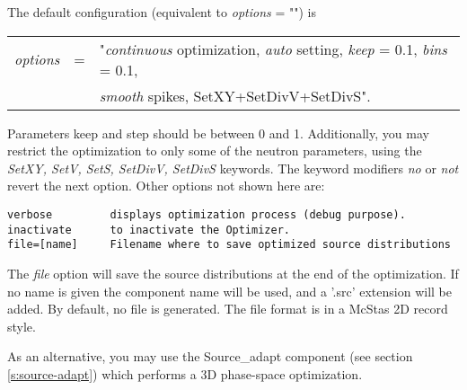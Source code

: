 The default configuration (equivalent to \textit{options} = "") is
\begin{center}
\begin{tabular}{rcl}
  \textit{options} & = & "\textit{continuous} optimization,
  \textit{auto} setting, \textit{keep} = 0.1, \textit{bins} = 0.1, \\
  & & \textit{smooth} spikes, SetXY+SetDivV+SetDivS".
\end{tabular}
\end{center}
Parameters keep and step should be between 0 and 1.
Additionally, you may restrict the optimization to only some of the neutron parameters, using the \textit{SetXY, SetV, SetS, SetDivV, SetDivS} keywords.
The keyword modifiers \textit{no} or \textit{not} revert the next option.
Other options not shown here are:
\begin{lstlisting}
verbose         displays optimization process (debug purpose).
inactivate      to inactivate the Optimizer.
file=[name]     Filename where to save optimized source distributions
\end{lstlisting}
The \textit{file} option will save the source distributions at the end of
the optimization. If no name is given the component name will be used,
and a '.src' extension will be added. By default, no file is generated.
The file format is in a McStas 2D record style.

As an alternative, you may use the Source\_adapt component
(see section \ref{s:source-adapt}) which performs
a 3D phase-space optimization.
